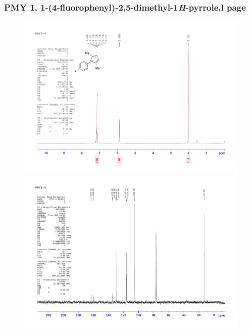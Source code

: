 \documentclass[12pt, a4paper,titlepage]{article}
\begin{document}
{\subsubsection*{PMY 1, 1-(4-fluorophenyl)-2,5-dimethyl-1\emph{H}-pyrrole,l page \pageref{exp:PMY1}}
\label{spec:PMY1}
	\begin{figure}[H] 
	\begin{center}
	\includegraphics[width=14.5cm]{expdata/PMY1/1H}
	\includegraphics[width=14.5cm]{expdata/PMY1/13C}
	\end{center}
	\end{figure}

}
\end{document}
